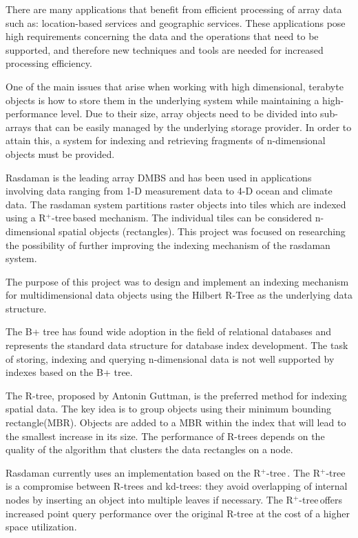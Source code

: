\documentclass[11pt, a4paper, oneside]{article}
\newcommand{\rplus}{R$^+$-tree$\,$}
\begin{document}
There are many applications that benefit from efficient processing of array data such as: location-based services and geographic services. These applications pose high requirements concerning the data and the operations that need to be supported, and therefore new techniques and tools are needed for increased processing efficiency.

One of the main issues that arise when working with high dimensional, terabyte objects is how to store them in the underlying system while maintaining a high-performance level. Due to their size, array objects need to be divided into sub-arrays that can be easily managed by the underlying storage provider. In order to attain this, a system for indexing and retrieving fragments of n-dimensional objects must be provided.

Rasdaman is the leading array DMBS and has been used in applications involving data ranging from 1-D measurement data to 4-D ocean and climate data. The rasdaman system partitions raster objects into tiles\cite{DBLP:conf/icde/FurtadoB99} which are indexed using a \rplus based mechanism. The individual tiles can be considered n-dimensional spatial objects (rectangles). This project was focused on researching the possibility of further improving the indexing mechanism of the rasdaman system.

The purpose of this project was to design and implement an indexing mechanism for multidimensional data objects using the Hilbert R-Tree as the underlying data structure. 

The B+ tree has found wide adoption in the field of relational databases and represents the standard data structure for database index development. The task of storing, indexing and querying n-dimensional data is not well supported by indexes based on the B+ tree. 

The R-tree, proposed by Antonin Guttman, is the preferred method for indexing spatial data. The key idea is to group objects using their minimum bounding rectangle(MBR). Objects are added to a MBR within the index that will lead to the smallest increase in its size. The performance of R-trees depends on the quality of the algorithm that clusters the data rectangles on a node. 

Rasdaman currently uses an implementation based on the \rplus. The \rplus is a compromise between R-trees and kd-trees: they avoid overlapping of internal nodes by inserting an object into multiple leaves if necessary. The \rplus offers increased point query performance over the original R-tree at the cost of a higher space utilization. 
\end{document}
